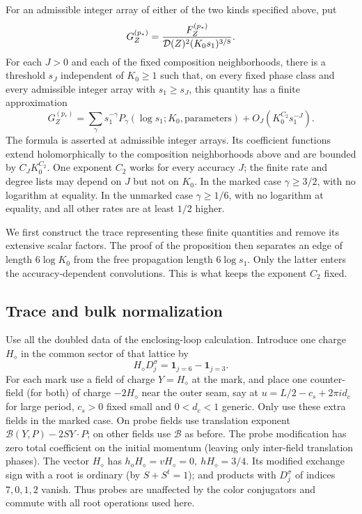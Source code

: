 \begin{proposition}\label{L:prop:two-scale}
For an admissible integer array of either of the two kinds specified
above, put
\[
 G_Z^{(p_*)}=\frac{F_Z^{(p_*)}}{{\cal D}(Z)^2(K_0s_1)^{3/8}}.
\]
For each $J>0$ and each of the fixed composition neighborhoods, there
is a threshold $s_J$ independent of $K_0\ge1$ such that, on every fixed
phase class and every admissible integer array with $s_1\ge s_J$,
this quantity has a finite approximation
\begin{equation}
 G_Z^{(p_*)}=
 \sum_\gamma s_1^{-\gamma}P_\gamma(\log s_1;K_0,\text{parameters})
       +O_J(K_0^{C_2}s_1^{-J}).\label{L:eq9}
\end{equation}
The formula is asserted at admissible integer arrays. Its coefficient
functions extend holomorphically to the composition neighborhoods above and
are bounded by $C_JK_0^{C_2}$. One exponent $C_2$ works for every accuracy $J$;
the finite rate and degree lists may depend on $J$ but not on $K_0$.
In the marked case $\gamma\ge3/2$, with no logarithm at equality.
In the unmarked case $\gamma\ge1/6$, with no logarithm at equality,
and all other rates are at least $1/2$ higher.
\end{proposition}

We first construct the trace representing these finite quantities and
remove its extensive scalar factors. The proof of the proposition then
separates an edge of length $6\log K_0$ from the free propagation length
$6\log s_1$. Only the latter enters the accuracy-dependent convolutions.
This is what keeps the exponent $C_2$ fixed.

\subsection{Trace and bulk normalization}\label{L:step14}

Use all the doubled data of the enclosing-loop calculation. Introduce one charge \(H_\diamond\) in the common sector of that lattice by
\[
 H_\diamond D_j^\sigma=\mathbf1_{j=6}-\mathbf1_{j=3}.
\]
For each mark use a field of charge \(Y=H_\diamond\) at the mark, and place one counter-field (for both) of charge \(-2H_\diamond\) near the outer seam, say at \(u=L/2-c_s+2\pi i d_c\) for large period, \(c_s>0\) fixed small and \(0<d_c<1\) generic. Only use these extra fields in the marked case. On probe fields use translation exponent \(\mathcal B(Y,P)-2SY\cdot P\); on other fields use \(\mathcal B\) as before. The probe modification has zero total coefficient on the initial momentum (leaving only inter-field translation phases). The vector \(H_\diamond\) has \(h_o H_\diamond=v H_\diamond=0,\ hH_\diamond=3/4\). Its modified exchange sign with a root is ordinary (by \(S+S^t=1\)); and products with \(D_j^\sigma\) of indices \(7,0,1,2\) vanish. Thus probes are unaffected by the color conjugators and commute with all root operations used here.

